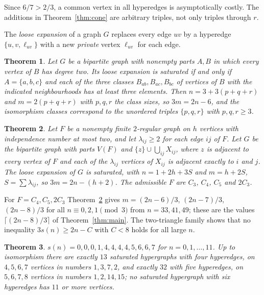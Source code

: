 \documentclass[11pt]{article}
\newtheorem{theorem}{Theorem}
\theoremstyle{remark}
\begin{document}
Since $6/7>2/3$, a common vertex in all hyperedges is asymptotically
costly. The additions in Theorem~\ref{thm:cone} are arbitrary triples, not
only triples through $r$.

The \emph{loose expansion} of a graph $G$ replaces every edge $uv$ by a
hyperedge $\{u,v,\ell_{uv}\}$ with a new \emph{private} vertex $\ell_{uv}$
for each edge.

\begin{theorem}\label{thm:hubs}
Let $G$ be a bipartite graph with nonempty parts $A,B$ in which every
vertex of $B$ has degree two. Its loose expansion is saturated if and only
if $A=\{a,b,c\}$ and each of the three classes $B_{ab},B_{ac},B_{bc}$ of
vertices of $B$ with the indicated neighbourhoods has at least three
elements. Then $n=3+3(p+q+r)$ and $m=2(p+q+r)$ with $p,q,r$ the class
sizes, so $3m=2n-6$, and the isomorphism classes correspond to the
unordered triples $\{p,q,r\}$ with $p,q,r\ge3$.
\end{theorem}

\begin{theorem}\label{thm:support}
Let $F$ be a nonempty finite $2$-regular graph on $h$ vertices with
independence number at most two, and let $\lambda_{ij}\ge2$ for each edge
$ij$ of $F$. Let $G$ be the bipartite graph with parts $V(F)$ and
$\{z\}\cup\bigcup_{ij}X_{ij}$, where $z$ is adjacent to every vertex of $F$
and each of the $\lambda_{ij}$ vertices of $X_{ij}$ is adjacent exactly to
$i$ and $j$. The loose expansion of $G$ is saturated, with $n=1+2h+3S$ and
$m=h+2S$, $S=\sum\lambda_{ij}$, so $3m=2n-(h+2)$. The admissible $F$ are
$C_3$, $C_4$, $C_5$ and $2C_3$.
\end{theorem}

For $F=C_4,C_5,2C_3$ Theorem~\ref{thm:support} gives $m=(2n-6)/3$,
$(2n-7)/3$, $(2n-8)/3$ for all $n\equiv0,2,1\pmod 3$ from $n=33,41,49$; these
are the values $\lceil(2n-8)/3\rceil$ of Theorem~\ref{thm:main}. The
two-triangle family shows that no inequality $3s(n)\ge2n-C$ with $C<8$
holds for all large $n$.

\begin{theorem}\label{thm:small}
$s(n)=0,0,0,1,4,4,4,4,5,6,6,7$ for $n=0,1,\dots,11$. Up to isomorphism there
are exactly $13$ saturated hypergraphs with four hyperedges, on $4,5,6,7$
vertices in numbers $1,3,7,2$, and exactly $32$ with five hyperedges, on
$5,6,7,8$ vertices in numbers $1,2,14,15$; no saturated hypergraph with six
hyperedges has $11$ or more vertices.
\end{theorem}
\end{document}
